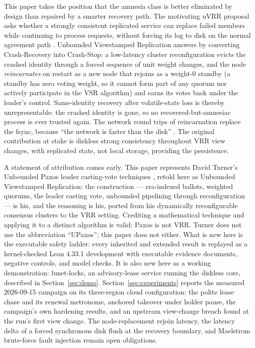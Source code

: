 \documentclass[10pt,journal,letterpaper]{IEEEtran}
\begin{document}
This paper takes the position that the amnesia class is better eliminated by
design than repaired by a smarter recovery path. The motivating uVRR proposal
asks whether a strongly consistent replicated service can replace failed
members while continuing to process requests, without forcing its log to disk
on the normal agreement path \cite{uvrr}. Unbounded Viewstamped Replication
answers by converting Crash-Recovery into Crash-Stop: a low-latency cluster
reconfiguration evicts the crashed identity through a forced sequence of
unit weight changes, and the node \emph{reincarnates} on restart as a new
node that rejoins as a weight-0 standby (a standby has zero voting weight, so
it cannot form part of any quorum nor actively participate in the VSR
algorithm) and earns its votes back under the leader's control. Same-identity
recovery after volatile-state loss is thereby unrepresentable: the crashed
identity is gone, so no recovered-but-amnesiac process is ever trusted again.
The network round trips of reincarnation replace the fsync, because ``the
network is faster than the disk'' \cite{netdisk}. The original contribution at
stake is diskless strong consistency throughout VRR view changes, with
replicated state, not local storage, providing the persistence.

A statement of attribution comes early. This paper represents David Turner's
Unbounded Paxos leader casting-vote techniques \cite{turner}, retold here as
Unbounded Viewstamped Replication: the construction --- era-indexed ballots,
weighted quorums, the leader casting vote, unbounded pipelining through
reconfiguration --- is his, and the reasoning is his, ported from his
dynamically reconfigurable consensus clusters to the VRR setting. Crediting a
mathematical technique and applying it to a distinct algorithm is valid: Paxos
is not VRR. Turner does
not use the abbreviation ``UPaxos''; this paper does not either. What is new
here is the executable safety ladder: every inherited and extended result is
replayed as a kernel-checked Lean 4.33.1 development with executable evidence
documents, negative controls, and model checks. It is also new here as a
working demonstration: lunet-locks, an advisory-lease service running the
diskless core, described in Section~\ref{sec:demo}. Section~\ref{sec:experiments}
reports the measured 2026-09-15 campaign on its three-region cloud
configuration: the polite lease chase and its renewal metronome, anchored
takeover under holder pause, the campaign's own hardening results, and an
upstream view-change breach found at the run's first view change. The
node-replacement rejoin latency, the latency delta of a forced synchronous
disk flush at the recovery boundary, and Maelstrom brute-force fault
injection remain open obligations.
\end{document}
